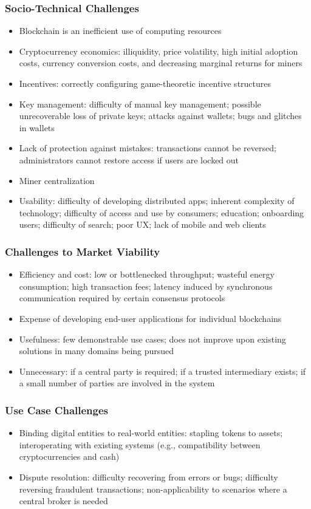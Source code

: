 {\subsubsection{Socio-Technical Challenges}
\begin{itemize}
	\item{Blockchain is an inefficient use of computing resources}
	\item{Cryptocurrency economics: illiquidity, price volatility, high initial adoption costs, currency conversion costs, and decreasing marginal returns for miners}
	\item{Incentives: correctly configuring game-theoretic incentive structures}
	\item{Key management: difficulty of manual key management; possible unrecoverable loss of private keys; attacks against wallets; bugs and glitches in wallets}	
	\item{Lack of protection against mistakes: transactions cannot be reversed; administrators cannot restore access if users are locked out}
	\item{Miner centralization}
	\item{Usability: difficulty of developing distributed apps; inherent complexity of technology; difficulty of access and use by consumers; education; onboarding users; difficulty of search; poor UX; lack of mobile and web clients}
\end{itemize}

\subsubsection{Challenges to Market Viability}
\begin{itemize}
	\item{Efficiency and cost: low or bottlenecked throughput; wasteful energy consumption; high transaction fees; latency induced by synchronous communication required by certain consensus protocols}
	\item{Expense of developing end-user applications for individual blockchains}
	\item{Usefulness: few demonstrable use cases; does not improve upon existing solutions in many domains being pursued}
	\item{Unnecessary: if a central party is required; if a trusted intermediary exists; if a small number of parties are involved in the system}
\end{itemize}

\subsubsection{Use Case Challenges}
\begin{itemize}
	\item{Binding digital entities to real-world entities: stapling tokens to assets; interoperating with existing systems (e.g., compatibility between cryptocurrencies and cash)}
	\item{Dispute resolution: difficulty recovering from errors or bugs; difficulty reversing fraudulent transactions; non-applicability to scenarios where a central broker is needed}
\end{itemize}

}
